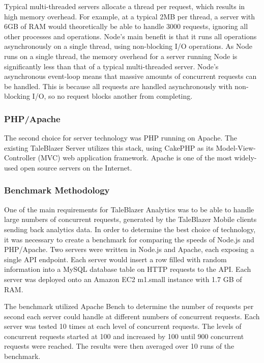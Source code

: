 Typical multi-threaded servers allocate a thread per request, which results in high memory overhead. For example, at a typical 2MB per thread, a server with 6GB of RAM would theoretically be able to handle 3000 requests, ignoring all other processes and operations. Node's main benefit is that it runs all operations asynchronously on a single thread, using non-blocking I/O operations. As Node runs on a single thread, the memory overhead for a server running Node is significantly less than that of a typical multi-threaded server. Node's asynchronous event-loop means that massive amounts of concurrent requests can be handled. This is because all requests are handled asynchronously with non-blocking I/O, so no request blocks another from completing. \cite{site:event-loop}

\subsubsection{PHP/Apache}

The second choice for server technology was PHP running on Apache. The existing TaleBlazer Server utilizes this stack, using CakePHP as its Model-View-Controller (MVC) web application framework. Apache is one of the most widely-used open source servers on the Internet.

\subsubsection{Benchmark Methodology}

One of the main requirements for TaleBlazer Analytics was to be able to handle large numbers of concurrent requests, generated by the TaleBlazer Mobile clients sending back analytics data. In order to determine the best choice of technology, it was necessary to create a benchmark for comparing the speeds of Node.js and PHP/Apache. Two servers were written in Node.js and Apache, each exposing a single API endpoint. Each server would insert a row filled with random information into a MySQL database table on HTTP requests to the API. 
Each server was deployed onto an Amazon EC2 m1.small instance with 1.7 GB of RAM. 

The benchmark utilized Apache Bench to determine the number of requests per second each server could handle at different numbers of concurrent requests. Each server was tested 10 times at each level of concurrent requests. The levels of concurrent requests started at 100 and increased by 100 until 900 concurrent requests were reached. The results were then averaged over 10 runs of the benchmark.

